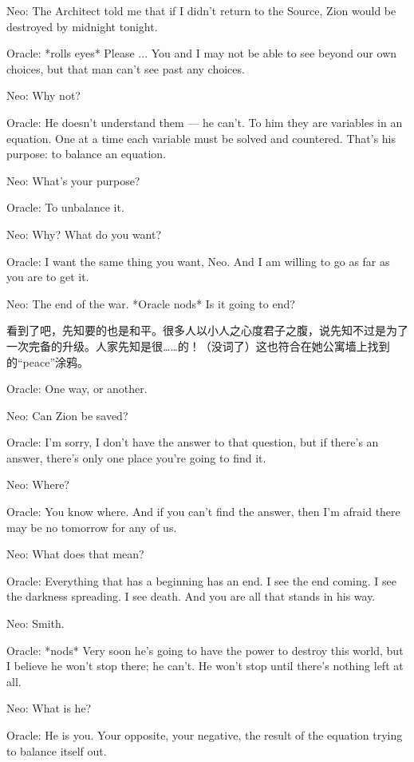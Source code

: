 \documentclass[UTF8]{ctexart}
\newenvironment{myquote}{\color{green} \setlength{\leftskip}{6em} \setlength{\rightskip}{4em} \setlength{\parindent}{-2em}}{\par}
\begin{document}
\begin{myquote}
Neo: The Architect told me that if I didn't return to the Source, Zion would be destroyed by midnight tonight.

Oracle: *rolls eyes* Please ... You and I may not be able to see beyond our own choices, but that man can't see past any choices.

Neo: Why not?

Oracle: He doesn't understand them --- he can't. To him they are variables in an equation. One at a time each variable must be solved and countered. That's his purpose: to balance an equation.

Neo: What's your purpose?

Oracle: To unbalance it.

Neo: Why? What do you want?

Oracle: I want the same thing you want, Neo. And I am willing to go as far as you are to get it.

Neo: The end of the war. *Oracle nods* Is it going to end?
\end{myquote}

看到了吧，先知要的也是和平。很多人以小人之心度君子之腹，说先知不过是为了一次完备的升级。人家先知是很……的！（没词了）这也符合在她公寓墙上找到的“peace”涂鸦。

\begin{myquote}
Oracle: One way, or another.

Neo: Can Zion be saved?

Oracle: I'm sorry, I don't have the answer to that question, but if there's an answer, there's only one place you're going to find it.

Neo: Where?

Oracle: You know where. And if you can't find the answer, then I'm afraid there may be no tomorrow for any of us.

Neo: What does that mean?

Oracle: Everything that has a beginning has an end. I see the end coming. I see the darkness spreading. I see death. And you are all that stands in his way.

Neo: Smith.

Oracle: *nods* Very soon he's going to have the power to destroy this world, but I believe he won't stop there; he can't. He won't stop until there's nothing left at all.

Neo: What is he?

Oracle: He is you. Your opposite, your negative, the result of the equation trying to balance itself out.
\end{myquote}
\end{document}
